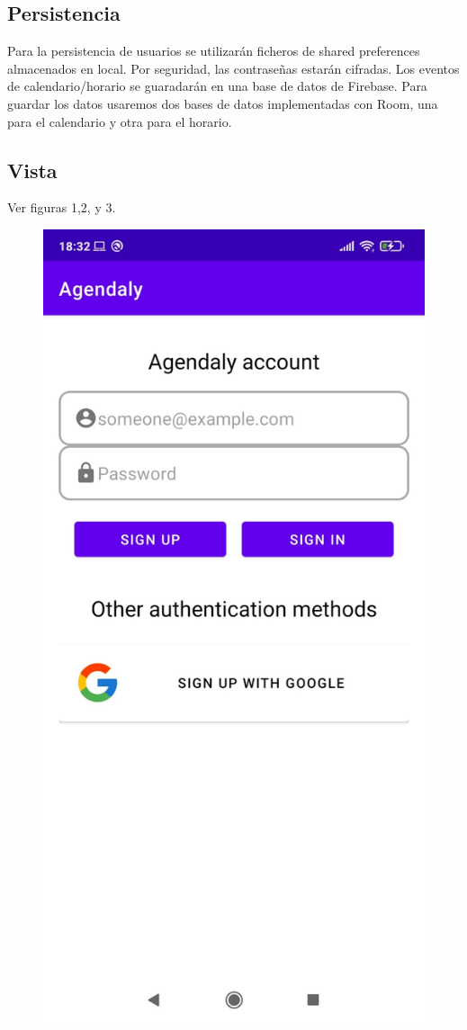 \documentclass[a4paper,openright,12pt]{article}
\begin{document}
\subsection{Persistencia}
Para la persistencia de usuarios se utilizarán ficheros de shared preferences almacenados en local. Por seguridad, las contraseñas estarán cifradas. Los eventos de calendario/horario se guaradarán en una base de datos de Firebase. Para guardar los datos usaremos dos bases de datos implementadas con Room, una para el calendario y otra para el horario.

\subsection{Vista}
Ver figuras 1,2, y 3.
\begin{figure}
            \includegraphics[scale=0.05]{view.jpeg} \hfill

\end{figure}
\end{document}

